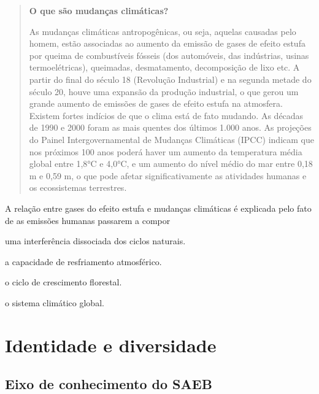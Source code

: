 \begin{quote}
\textbf{O que são mudanças climáticas?}

As mudanças climáticas antropogênicas, ou seja, aquelas causadas
pelo homem, estão associadas ao aumento da emissão de gases de efeito
estufa por queima de combustíveis fósseis (dos automóveis, das
indústrias, usinas termoelétricas), queimadas, desmatamento,
decomposição de lixo etc. A partir do final do século 18 (Revolução
Industrial) e na segunda metade do século 20, houve uma expansão da
produção industrial, o que gerou um grande aumento de emissões de gases
de efeito estufa na atmosfera. Existem fortes indícios de que o clima
está de fato mudando. As décadas de 1990 e 2000 foram as mais quentes
dos últimos 1.000 anos. As projeções do Painel Intergovernamental de
Mudanças Climáticas (IPCC) indicam que nos próximos 100 anos poderá
haver um aumento da temperatura média global entre 1,8°C e 4,0°C, e um
aumento do nível médio do mar entre 0,18 m e 0,59 m, o que pode afetar
significativamente as atividades humanas e os ecossistemas terrestres.

\end{quote}

A relação entre gases do efeito estufa e mudanças climáticas é explicada pelo fato
de as emissões humanas passarem a compor

\begin{escolha}
\item
  uma interferência dissociada dos ciclos naturais.
\item
  a capacidade de resfriamento atmosférico.
\item
  o ciclo de crescimento florestal.
\item
  o sistema climático global.
\end{escolha}

\chapter{Identidade e diversidade}

\section{Eixo de conhecimento do SAEB} 

